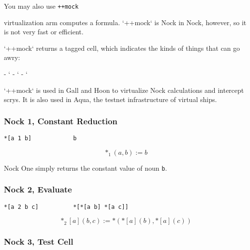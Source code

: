 You may also use \texttt{++mock}

virtualization arm computes a formula.  `++mock` is Nock in Nock, however, so it is not very fast or efficient.

`++mock` returns a tagged cell, which indicates the kinds of things that can go awry:

- `%
- `%
- `%

`++mock` is used in Gall and Hoon to virtualize Nock calculations and intercept scrys.  It is also used in Aqua, the testnet infrastructure of virtual ships.

\subsubsection[Nock 1]{Nock 1, Constant Reduction}

\begin{lstlisting}[style=nonumbers]
*[a 1 b]            b
\end{lstlisting}

$$
*_{1}(a,b) := b
$$

Nock One simply returns the constant value of noun \texttt{b}.

\subsubsection[Nock 2]{Nock 2, Evaluate}

\begin{lstlisting}[style=nonumbers]
*[a 2 b c]          *[*[a b] *[a c]]
\end{lstlisting}

$$
*_{2}[a](b,c) := *({*[a](b)}, {*[a](c)})
$$

\subsubsection[Nock 3]{Nock 3, Test Cell}


